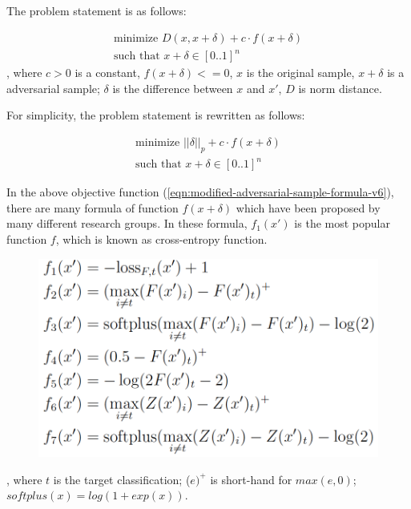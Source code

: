 \documentclass[12pt]{article}
\begin{document}
The problem statement is as follows:

\begin{equation}
\begin{split}
\label{eqn:modified-adversarial-sample-formula-v2}
\text{minimize } D(x, x + \delta) + c \cdot f(x+\delta)
\\
\text{such that } x + \delta \in [0..1]^n
\end{split}
\end{equation}
, where $c > 0$ is a constant, $f(x+\delta) <= 0$, $x$ is the original sample, $x + \delta$ is a adversarial sample; $\delta$ is the difference between $x$ and $x'$, $D$ is norm distance.

For simplicity, the problem statement is rewritten as follows:

\begin{equation}
\begin{split}
\label{eqn:modified-adversarial-sample-formula-v6}
\text{minimize } ||\delta||_p + c \cdot f(x+\delta)
\\
\text{such that } x + \delta \in [0..1]^n
\end{split}
\end{equation}

In the above objective function (\ref{eqn:modified-adversarial-sample-formula-v6}), there are many formula of function $f(x+\delta)$ which have been proposed by many different research groups. In these formula, $f_1(x')$ is the most popular function $f$, which is known as cross-entropy function.

\begin{figure}[h]
	\centering
	\vspace{-6mm}
	\vspace*{5mm} 
	\includegraphics[scale=0.6]{img/f}
	\vspace{-4mm}	
\end{figure}
, where $t$ is the target classification; ($e)^+$ is short-hand for $max(e, 0)$; $softplus(x) = log(1+exp(x))$.
\end{document}
